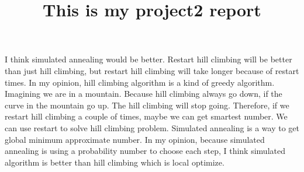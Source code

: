 \documentclass[12pt]{article}
\begin{document}
\title{This is my project2 report}
\maketitle

I think simulated annealing would be better. Restart hill climbing will be better than just hill climbing, but restart hill climbing will take longer because of restart times. In my opinion, hill climbing algorithm is a kind of greedy algorithm. Imagining we are in a mountain. Because hill climbing always go down, if the curve in the mountain go up. The hill climbing will stop going. Therefore, if we restart hill climbing a couple of times, maybe we can get smartest number. 
We can use restart to solve hill climbing problem. Simulated annealing is a way to get global minimum approximate number. In my opinion, because simulated annealing is using a probability number to choose each step, I think simulated algorithm is better than hill climbing which is local optimize. 
\end{document}
